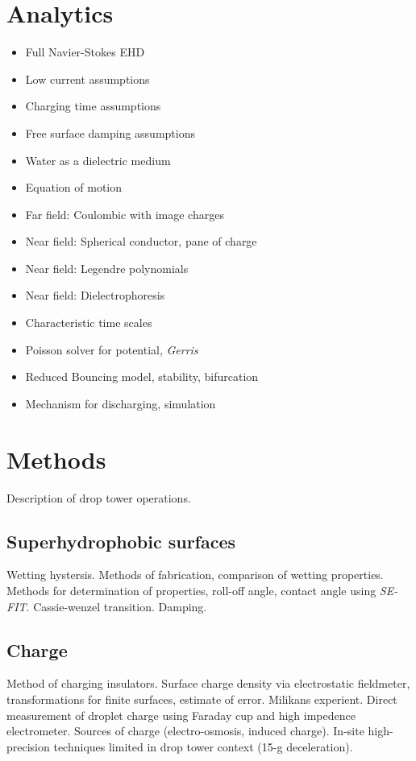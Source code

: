 \documentclass{jfm}
\begin{document}
\section{Analytics}
\begin{itemize}
\item Full Navier-Stokes EHD
\item Low current assumptions
\item Charging time assumptions
\item Free surface damping assumptions
\item Water as a dielectric medium
\item Equation of motion
\item Far field: Coulombic with image charges
\item Near field: Spherical conductor, pane of charge
\item Near field: Legendre polynomials
\item Near field: Dielectrophoresis
\item Characteristic time scales
\item Poisson solver for potential, \emph{Gerris}
\item Reduced Bouncing model, stability, bifurcation
\item Mechanism for discharging, simulation
\end{itemize}

\section{Methods}
Description of drop tower operations.
 
\subsection{Superhydrophobic surfaces}
Wetting hystersis. Methods of fabrication, comparison of wetting properties. Methods for determination of properties, roll-off angle, contact angle using \emph{SE-FIT}. Cassie-wenzel transition. Damping.
\subsection{Charge}
Method of charging insulators. Surface charge density via electrostatic fieldmeter, transformations for finite surfaces, estimate of error. Milikans experient. Direct measurement of droplet charge using Faraday cup and high impedence electrometer. Sources of charge (electro-osmosis, induced charge). In-site high-precision techniques limited in drop tower context (15-g deceleration).
\end{document}
